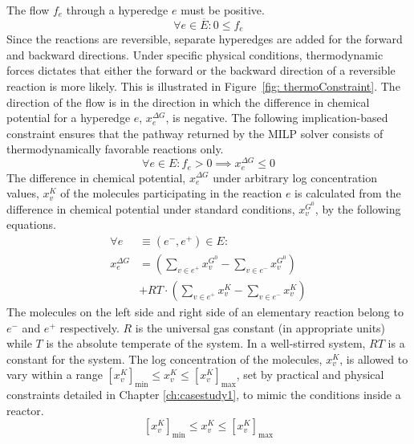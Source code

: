 The flow $f_e$ through a hyperedge $e$ must be positive. 
\begin{equation}
    \forall e \in \overline{E}\colon  0 \leq f_e
    \label{proposed_constraint2}
\end{equation}
Since the reactions are reversible, separate hyperedges are added for the forward and backward directions.
Under specific physical conditions, thermodynamic forces dictates that either the forward or the backward direction of a reversible reaction is more likely. This is illustrated in Figure~\ref{fig: thermoConstraint}.
The direction of the flow is in the direction in which the difference in chemical potential for a hyperedge $e$, $x^{\Delta G}_e$, is negative.
The following implication-based constraint ensures that the pathway returned by the MILP solver consists of thermodynamically favorable reactions only.
\begin{equation}
    \forall e \in E\colon  f_e > 0 \implies x^{\Delta G}_e \leq 0 \label{proposed_constraint3}
\end{equation}
The difference in chemical potential, $x^{\Delta G}_e$ under arbitrary log concentration values, $x^K_v$ of the molecules participating in the reaction $e$ is calculated from the difference in chemical potential under standard conditions, $x^{G^0}_v$, by the following equations.
\begin{align}
    \forall e&\equiv (e^-, e^+) \in E\colon  \nonumber\\
    x^{\Delta G}_e &= \left(\sum_{v\in e^+} x^{G^0}_v - \sum_{v\in e^-} x^{G^0}_v\right) \nonumber\\
    &+ RT\cdot \left(\sum_{v\in e^+} x^K_v - \sum_{v\in e^-} x^K_v\right) \label{proposed_constraint4}
\end{align}
The molecules on the left side and right side of an elementary reaction belong to $e^-$ and $e^+$ respectively.
$R$ is the universal gas constant (in appropriate units) while $T$ is the absolute temperate of the system.
In a well-stirred system, $RT$ is a constant for the system.  
The log concentration of the molecules, $x_v^K$, is allowed to vary within a range $\left[x^K_v\right]_{\text{min}} \leq x_v^K \leq  \left[x^K_v\right]_{\text{max}}$,
set by practical and physical constraints detailed in Chapter \ref{ch:casestudy1}, to mimic the conditions inside a reactor.
\begin{equation}
    \left[x^K_v\right]_{\text{min}} \leq x^K_v \leq \left[x^K_v\right]_{\text{max}} \label{proposed_constraint8}
\end{equation}

